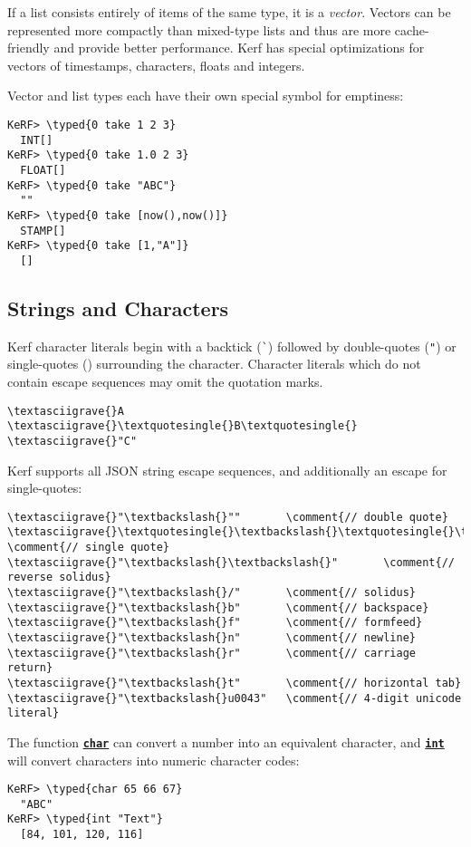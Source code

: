 \documentclass{article}
\newcommand{\typed}[1]{\textcolor{TealBlue}{#1}}
\newcommand{\comment}[1]{\textcolor{Orange}{#1}}
\newcommand{\primu}[2]{\hyperref[prim:#2]{\textbf{\texttt{#1}}}}
\newcommand{\prim}[1]{\primu{#1}{#1}}
\begin{document}
If a list consists entirely of items of the same type, it is a \emph{vector}. Vectors can be represented more compactly than mixed-type lists and thus are more cache-friendly and provide better performance. Kerf has special optimizations for vectors of timestamps, characters, floats and integers.

\vspace{0.5cm}

Vector and list types each have their own special symbol for emptiness:
\begin{Verbatim}
KeRF> \typed{0 take 1 2 3}
  INT[]
KeRF> \typed{0 take 1.0 2 3}
  FLOAT[]
KeRF> \typed{0 take "ABC"}
  ""
KeRF> \typed{0 take [now(),now()]}
  STAMP[]
KeRF> \typed{0 take [1,"A"]}
  []
\end{Verbatim}

\pagebreak
\subsection{Strings and Characters}
Kerf character literals begin with a backtick (\texttt{\`}) followed by double-quotes (\texttt{"}) or single-quotes (\texttt{\textquotesingle}) surrounding the character. Character literals which do not contain escape sequences may omit the quotation marks.
\begin{Verbatim}
\textasciigrave{}A
\textasciigrave{}\textquotesingle{}B\textquotesingle{}
\textasciigrave{}"C"
\end{Verbatim}
Kerf supports all JSON string escape sequences, and additionally an escape for single-quotes:
\begin{Verbatim}
\textasciigrave{}"\textbackslash{}""       \comment{// double quote}
\textasciigrave{}\textquotesingle{}\textbackslash{}\textquotesingle{}\textquotesingle{}       \comment{// single quote}
\textasciigrave{}"\textbackslash{}\textbackslash{}"       \comment{// reverse solidus}
\textasciigrave{}"\textbackslash{}/"       \comment{// solidus}
\textasciigrave{}"\textbackslash{}b"       \comment{// backspace}
\textasciigrave{}"\textbackslash{}f"       \comment{// formfeed}
\textasciigrave{}"\textbackslash{}n"       \comment{// newline}
\textasciigrave{}"\textbackslash{}r"       \comment{// carriage return}
\textasciigrave{}"\textbackslash{}t"       \comment{// horizontal tab}
\textasciigrave{}"\textbackslash{}u0043"   \comment{// 4-digit unicode literal}
\end{Verbatim}
The function \prim{char} can convert a number into an equivalent character, and \prim{int} will convert characters into numeric character codes:
\begin{Verbatim}
KeRF> \typed{char 65 66 67}
  "ABC"
KeRF> \typed{int "Text"}
  [84, 101, 120, 116]
\end{Verbatim}
\end{document}

